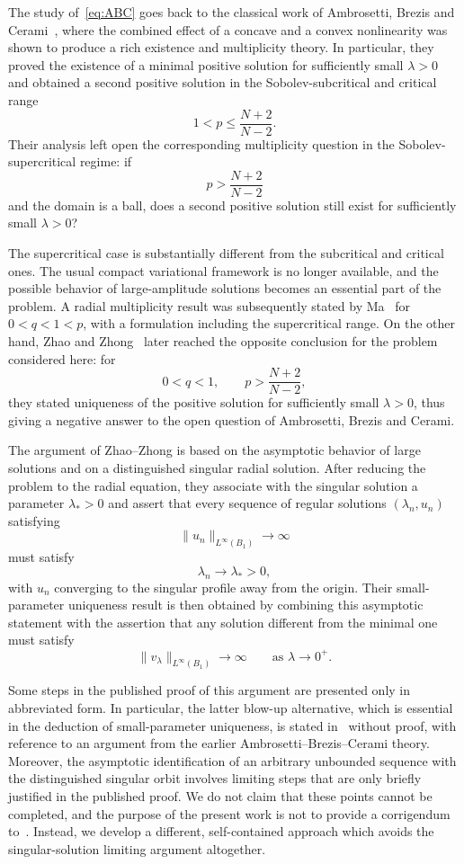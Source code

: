 \documentclass[11pt]{article}
\theoremstyle{definition}
\begin{document}
The study of~\eqref{eq:ABC} goes back to the classical work of
Ambrosetti, Brezis and Cerami~\cite{ABC}, where the combined effect
of a concave and a convex nonlinearity was shown to produce a rich
existence and multiplicity theory. In particular, they proved the
existence of a minimal positive solution for sufficiently small
$\lambda>0$ and obtained a second positive solution in the
Sobolev-subcritical and critical range
\[
1<p\leq \frac{N+2}{N-2}.
\]
Their analysis left open the corresponding multiplicity question in
the Sobolev-supercritical regime: if
\[
p>\frac{N+2}{N-2}
\]
and the domain is a ball, does a second positive solution still exist
for sufficiently small $\lambda>0$?

The supercritical case is substantially different from the
subcritical and critical ones. The usual compact variational
framework is no longer available, and the possible behavior of
large-amplitude solutions becomes an essential part of the problem.
A radial multiplicity result was subsequently stated by
Ma~\cite{Ma1996} for $0<q<1<p$, with a formulation including the
supercritical range. On the other hand, Zhao and
Zhong~\cite{ZhaoZhong2002} later reached the opposite conclusion for
the problem considered here: for
\[
0<q<1,
\qquad
p>\frac{N+2}{N-2},
\]
they stated uniqueness of the positive solution for sufficiently
small $\lambda>0$, thus giving a negative answer to the open question
of Ambrosetti, Brezis and Cerami.

The argument of Zhao--Zhong is based on the asymptotic behavior of
large solutions and on a distinguished singular radial solution.
After reducing the problem to the radial equation, they associate
with the singular solution a parameter $\lambda_*>0$ and assert that
every sequence of regular solutions $(\lambda_n,u_n)$ satisfying
\[
\|u_n\|_{L^\infty(B_1)}\longrightarrow\infty
\]
must satisfy
\[
\lambda_n\longrightarrow\lambda_*>0,
\]
with $u_n$ converging to the singular profile away from the origin.
Their small-parameter uniqueness result is then obtained by combining
this asymptotic statement with the assertion that any solution
different from the minimal one must satisfy
\[
\|v_\lambda\|_{L^\infty(B_1)}
\longrightarrow\infty
\qquad\text{as }\lambda\to0^+.
\]

Some steps in the published proof of this argument are presented only
in abbreviated form. In particular, the latter blow-up alternative,
which is essential in the deduction of small-parameter uniqueness,
is stated in~\cite{ZhaoZhong2002} without proof, with reference to an
argument from the earlier Ambrosetti--Brezis--Cerami theory. Moreover,
the asymptotic identification of an arbitrary unbounded sequence with
the distinguished singular orbit involves limiting steps that are
only briefly justified in the published proof. We do not claim that
these points cannot be completed, and the purpose of the present work
is not to provide a corrigendum to~\cite{ZhaoZhong2002}. Instead, we
develop a different, self-contained approach which avoids the
singular-solution limiting argument altogether.
\end{document}

